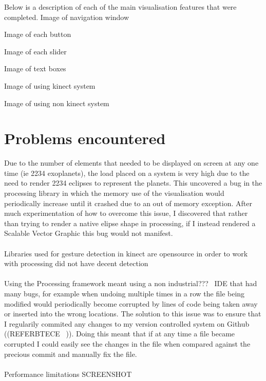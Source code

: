 Below is a description of each of the main visualisation features that were completed.
Image of navigation window

Image of each button

Image of each slider

Image of text boxes

Image of using kinect system

Image of using non kinect system

\section{Problems encountered}
Due to the number of elements that needed to be displayed on screen at any one time (ie 2234 exoplanets), the load placed on a system is very high due to the need to render 2234 eclipses to represent the planets. This uncovered a bug in the processing library in which the memory use of the visualisation would periodically increase until it crashed due to an out of memory exception. After much experimentation of how to overcome this issue, I discovered that rather than trying to render a native elipse shape in processing, if I instead rendered a Scalable Vector Graphic this bug would not manifest. 
\\\\
Libraries used for gesture detection in kinect are opensource in order to work with processing did not have decent detection
\\\\
Using the Processing framework meant using a non industrial???~ IDE that had many bugs, for example when undoing multiple times in a row the file being modified would periodically become corrupted by lines of code being taken away or inserted into the wrong locations. The solution to this issue was to ensure that I regularily commited any changes to my version controlled system on Github ((REFERBTECE ~)). Doing this meant that if at any time a file became corrupted I could easily see the changes in the file when compared against the precious commit and manually fix the file. 
\\\\
Performance limitations
SCREENSHOT ~